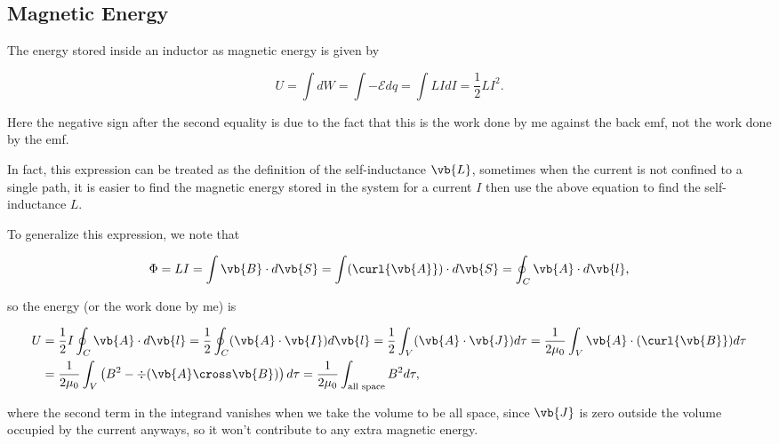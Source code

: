 \documentclass[english,a4paper,12pt]{report}
\begin{document}


\subsection{Magnetic Energy}

The energy stored inside an inductor as magnetic energy is given by 

\begin{equation}
    U = \int dW = \int -\mathcal{E}dq = \int LIdI = \frac{1}{2}LI^2. 
\end{equation}

Here the negative sign after the second equality is due to the fact that this is the work done by me against the back emf, not the work done by the emf.

In fact, this expression can be treated as the definition of the self-inductance \(\vb{L}\), sometimes when the current is not confined to a single path, it is easier to find the magnetic energy stored in the system for a current \(I\) then use the above equation to find the self-inductance \(L\).  

To generalize this expression, we note that 

\begin{equation}
    \Phi = LI = \int \vb{B} \cdot d\vb{S} = \int (\curl{\vb{A} } ) \cdot d\vb{S} = \oint_{C} \vb{A} \cdot d\vb{l},
\end{equation}

so the energy (or the work done by me) is 

\begin{equation}
    \begin{aligned} 
    U &= \frac{1}{2} I \oint_{C} \vb{A} \cdot d\vb{l}   = \frac{1}{2} \oint_{C} (\vb{A} \cdot \vb{I} )d\vb{l} = \frac{1}{2} \int_{V}^{} (\vb{A} \cdot \vb{J} )d\tau = \frac{1}{2\mu_0 } \int_{V}^{} \vb{A} \cdot (\curl{\vb{B} } )d\tau \\
    &= \frac{1}{2\mu_0 }\int_{V}^{} \left( B^2-\div{(\vb{A} \cross \vb{B} )}  \right) d\tau = \frac{1}{2\mu_0 } \int_{\text{all space} }^{} B^2d\tau ,    
    \end{aligned}   
\end{equation}

where the second term in the integrand vanishes when we take the volume to be all space, since \(\vb{J} \) is zero outside the volume occupied by the current anyways, so it won't contribute to any extra magnetic energy. 
\end{document}
